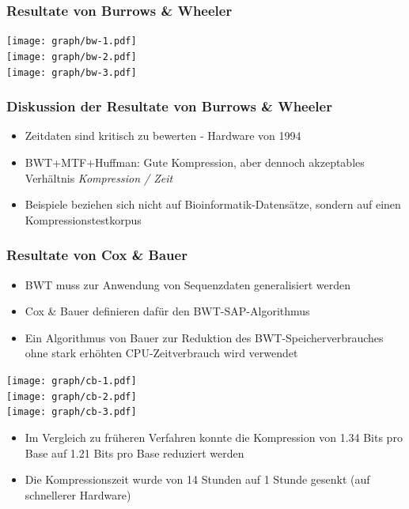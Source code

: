 \documentclass[14pt,xcolor=dvipsnames,pdftex]{beamer}
\begin{document}
\begin{frame}[allowframebreaks]
 \frametitle{Resultate von Burrows \& Wheeler}
 \texttt{[image: graph/bw-1.pdf]}
 \framebreak\\
 \texttt{[image: graph/bw-2.pdf]}
 \framebreak\\
 \texttt{[image: graph/bw-3.pdf]}
\end{frame}
\begin{frame}
 \frametitle{Diskussion der Resultate von Burrows \& Wheeler}
 \begin{itemize}
  \item Zeitdaten sind kritisch zu bewerten - Hardware von 1994
  \item BWT+MTF+Huffman: Gute Kompression, aber dennoch akzeptables Verhältnis \textit{Kompression / Zeit}
  \item Beispiele beziehen sich nicht auf Bioinformatik-Datensätze, sondern auf einen Kompressionstestkorpus
 \end{itemize}
\end{frame}
\begin{frame}[allowframebreaks]
 \frametitle{Resultate von Cox \& Bauer}
 \begin{itemize}
  \item BWT muss zur Anwendung von Sequenzdaten generalisiert werden
  \item Cox \& Bauer definieren dafür den BWT-SAP-Algorithmus
  \item Ein Algorithmus von Bauer zur Reduktion des BWT-Speicherverbrauches ohne stark erhöhten CPU-Zeitverbrauch wird verwendet
 \end{itemize}
 \framebreak
 \texttt{[image: graph/cb-1.pdf]}
 \framebreak\\
 \texttt{[image: graph/cb-2.pdf]}
 \framebreak\\
 \texttt{[image: graph/cb-3.pdf]}
 \framebreak
 \begin{itemize}
  \item Im Vergleich zu früheren Verfahren konnte die Kompression von 1.34 Bits pro Base auf 1.21 Bits pro Base reduziert werden
  \item Die Kompressionszeit wurde von 14 Stunden auf 1 Stunde gesenkt (auf schnellerer Hardware)
 \end{itemize}
\end{frame}
\end{document}
